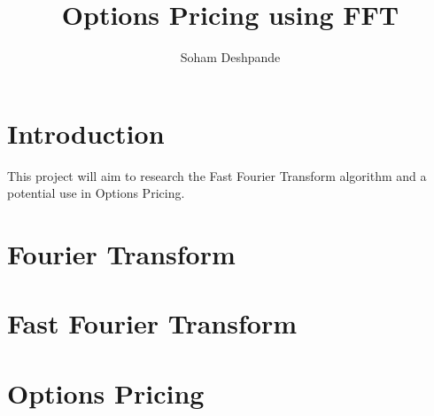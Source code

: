 \documentclass[12pt]{article}
\begin{document}
\title{Options Pricing using FFT }
\author{Soham Deshpande}
\maketitle
\clearpage
\tableofcontents
\clearpage

\section{Introduction}
This project will aim to research the Fast Fourier Transform algorithm and a potential use in Options Pricing.

\clearpage
\section{Fourier Transform}

\clearpage
\section{Fast Fourier Transform}

\clearpage
\section{Options Pricing}
\end{document}
